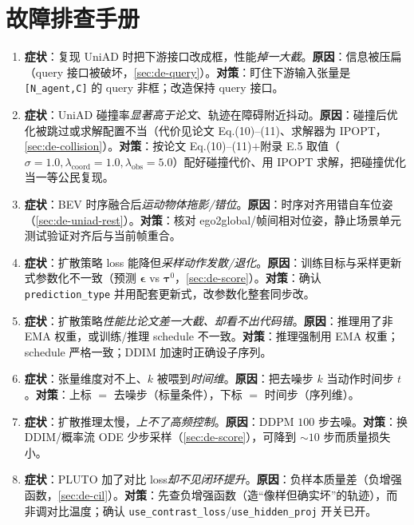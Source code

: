 \section*{故障排查手册}
\begin{enumerate}
  \item \textbf{症状}：复现 UniAD 时把下游接口改成框，性能\emph{掉一大截}。\textbf{原因}：信息被压扁（query 接口被破坏，\cref{sec:de-query}）。\textbf{对策}：盯住下游输入张量是 \texttt{[N\_agent,C]} 的 query 非框；改造保持 query 接口。
  \item \textbf{症状}：UniAD 碰撞率\emph{显著高于论文}、轨迹在障碍附近抖动。\textbf{原因}：碰撞后优化被跳过或求解配置不当（代价见论文 Eq.(10)--(11)、求解器为 IPOPT，\cref{sec:de-collision}）。\textbf{对策}：按论文 Eq.(10)--(11)$+$附录 E.5 取值（$\sigma=1.0,\lambda_{\text{coord}}=1.0,\lambda_{\text{obs}}=5.0$）配好碰撞代价、用 IPOPT 求解，把碰撞优化当一等公民复现。
  \item \textbf{症状}：BEV 时序融合后\emph{运动物体拖影/错位}。\textbf{原因}：时序对齐用错自车位姿（\cref{sec:de-uniad-rest}）。\textbf{对策}：核对 ego2global/帧间相对位姿，静止场景单元测试验证对齐后与当前帧重合。
  \item \textbf{症状}：扩散策略 loss 能降但\emph{采样动作发散/退化}。\textbf{原因}：训练目标与采样更新式参数化不一致（预测 $\boldsymbol{\epsilon}$ vs $\boldsymbol{\tau}^0$，\cref{sec:de-score}）。\textbf{对策}：确认 \texttt{prediction\_type} 并用配套更新式，改参数化整套同步改。
  \item \textbf{症状}：扩散策略\emph{性能比论文差一大截、却看不出代码错}。\textbf{原因}：推理用了非 EMA 权重，或训练/推理 schedule 不一致。\textbf{对策}：推理强制用 EMA 权重；schedule 严格一致；DDIM 加速时正确设子序列。
  \item \textbf{症状}：张量维度对不上、$k$ 被喂到\emph{时间维}。\textbf{原因}：把去噪步 $k$ 当动作时间步 $t$。\textbf{对策}：上标 $=$ 去噪步（标量条件），下标 $=$ 时间步（序列维）。
  \item \textbf{症状}：扩散推理太慢，\emph{上不了高频控制}。\textbf{原因}：DDPM $100$ 步去噪。\textbf{对策}：换 DDIM/概率流 ODE 少步采样（\cref{sec:de-score}），可降到 $\sim 10$ 步而质量损失小。
  \item \textbf{症状}：PLUTO 加了对比 loss\emph{却不见闭环提升}。\textbf{原因}：负样本质量差（负增强函数，\cref{sec:de-cil}）。\textbf{对策}：先查负增强函数（造“像样但确实坏”的轨迹），而非调对比温度；确认 \texttt{use\_contrast\_loss}/\texttt{use\_hidden\_proj} 开关已开。

\end{enumerate}
